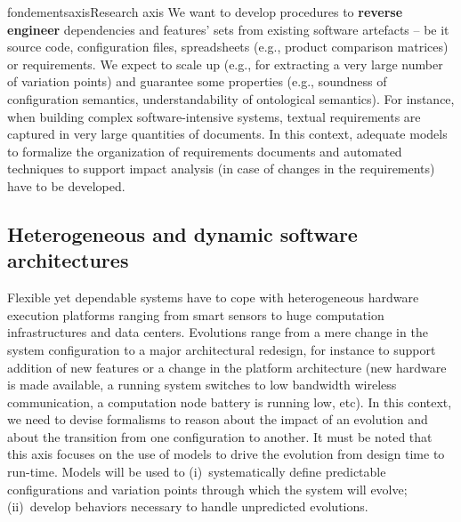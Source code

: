 \documentclass{ra2018}
\begin{document}
\begin{module}{fondements}{axis}{Research axis}
We want to develop procedures to \textbf{reverse engineer} dependencies and features' sets from existing software artefacts -- be it source code, configuration files, spreadsheets (e.g., product comparison matrices) or requirements. 
We expect to scale up (e.g., for extracting a very large number of variation points) and guarantee some properties (e.g., soundness of configuration semantics, understandability of ontological semantics). 
For instance, when building complex software-intensive systems, textual requirements are captured in very large quantities of documents. In this context, adequate models to formalize the organization of requirements documents and automated techniques to support impact analysis (in case of changes in the requirements) have to be developed.





\subsection{Heterogeneous and dynamic software architectures}
\label{sec:axis-runtime}



Flexible yet dependable systems have to cope with heterogeneous hardware execution platforms ranging from smart sensors to huge computation infrastructures and data centers. Evolutions range from a mere change in the system configuration to a major architectural redesign,  for instance to support addition of new features or a change in the platform architecture (new hardware is made available, a running system switches to low bandwidth wireless communication, a computation node battery is running low, etc).
In this context, we need to devise formalisms to reason about the impact of an evolution and about the transition from one configuration to another.
It must be noted that this axis focuses on the use of models to drive the evolution from design time to run-time. 
Models will be used to (i)~systematically define predictable configurations and variation points through which the system will evolve;
(ii)~develop behaviors necessary to handle unpredicted evolutions.


\end{module}
\end{document}
